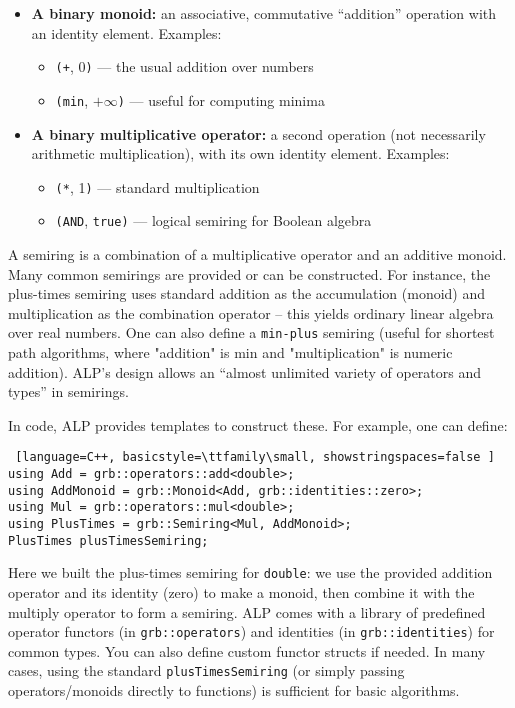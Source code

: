 \begin{itemize}
  \item \textbf{A binary monoid:} an associative, commutative ``addition'' operation with an identity element. Examples:
  \begin{itemize}
    \item \texttt{(+}, 0\texttt{)} — the usual addition over numbers
    \item \texttt{(min}, $+\infty$\texttt{)} — useful for computing minima
  \end{itemize}
  
  \item \textbf{A binary multiplicative operator:} a second operation (not necessarily arithmetic multiplication), with its own identity element. Examples:
  \begin{itemize}
    \item \texttt{(*}, 1\texttt{)} — standard multiplication
    \item \texttt{(AND}, \texttt{true}\texttt{)} — logical semiring for Boolean algebra
  \end{itemize}
\end{itemize}

A semiring is a combination of a multiplicative operator and an additive monoid. Many common semirings are provided or can be constructed. For instance, the plus-times semiring uses standard addition as the accumulation (monoid) and multiplication as the combination operator – this yields ordinary linear algebra over real numbers. One can also define a \texttt{min-plus} semiring (useful for shortest path algorithms, where "addition" is min and "multiplication" is numeric addition). ALP’s design allows an “almost unlimited variety of operators and types” in semirings.

In code, ALP provides templates to construct these. For example, one can define:
\begin{lstlisting} [language=C++, basicstyle=\ttfamily\small, showstringspaces=false ]
using Add = grb::operators::add<double>;
using AddMonoid = grb::Monoid<Add, grb::identities::zero>;
using Mul = grb::operators::mul<double>;
using PlusTimes = grb::Semiring<Mul, AddMonoid>;
PlusTimes plusTimesSemiring;
\end{lstlisting}
Here we built the plus-times semiring for \texttt{double}: we use the provided addition operator and its identity (zero) to make a monoid, then combine it with the multiply operator to form a semiring. ALP comes with a library of predefined operator functors (in \texttt{grb::operators}) and identities (in \texttt{grb::identities}) for common types. You can also define custom functor structs if needed. In many cases, using the standard \texttt{plusTimesSemiring} (or simply passing operators/monoids directly to functions) is sufficient for basic algorithms.

